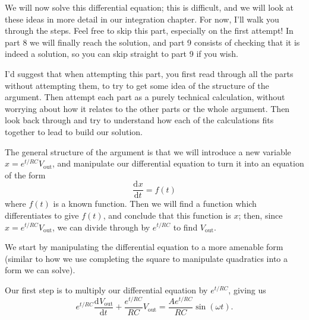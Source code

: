\documentclass{article}
\newcommand{\deriv}[3][]{\frac{\mathrm{d}^{#1} #2}{\mathrm{d}#3^{#1}}}
\begin{document}
{\color{red}

We will now solve this differential equation; this is difficult, and we will look at these ideas in more detail in our integration chapter. For now, I'll walk you through the steps. Feel free to skip this part, especially on the first attempt! In part 8 we will finally reach the solution, and part 9 consists of checking that it is indeed a solution, so you can skip straight to part 9 if you wish.

I'd suggest that when attempting this part, you first read through all the parts without attempting them, to try to get some idea of the structure of the argument. Then attempt each part as a purely technical calculation, without worrying about how it relates to the other parts or the whole argument. Then look back through and try to understand how each of the calculations fits together to lead to build our solution.

The general structure of the argument is that we will introduce a new variable $x=e^{t/RC}V_\mathrm{out}$, and manipulate our differential equation to turn it into an equation of the form
\[\deriv{x}{t}=f(t)\]
where $f(t)$ is a known function. Then we will find a function which differentiates to give $f(t)$, and conclude that this function is $x$; then, since $x=e^{t/RC}V_\mathrm{out}$, we can divide through by $e^{t/RC}$ to find $V_\mathrm{out}$.

We start by manipulating the differential equation to a more amenable form (similar to how we use completing the square to manipulate quadratics into a form we can solve).

Our first step is to multiply our differential equation by $e^{t/RC}$, giving us
\begin{equation}
	e^{t/RC}\deriv{V_\mathrm{out}}{t}+\frac{e^{t/RC}}{RC}V_\mathrm{out}= \frac{Ae^{t/RC}}{RC}\sin(\omega t).\tag{$\star$}
\end{equation}\bigskip



}
\end{document}
